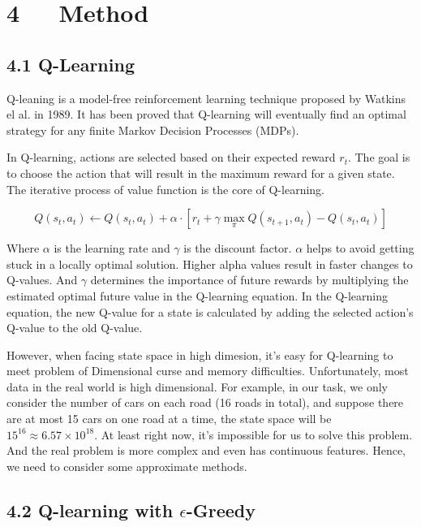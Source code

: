 \documentclass[letterpaper]{article} %
\begin{document}
\section{4\ \ \ Method}

\subsection{4.1 Q-Learning}
\hspace*{1em}Q-leaning is a model-free reinforcement learning technique proposed by Watkins el al. in 1989. It has been proved that Q-learning will eventually find an optimal strategy for any finite Markov Decision Processes (MDPs).
\vspace*{0.1cm}

In Q-learning, actions are selected based on their expected reward $r_t$. The goal is to choose the action that will result in the maximum reward for a given state. The iterative process of value function is the core of Q-learning.
\begin{small}
	$$Q(s_t,a_t)\leftarrow Q(s_t,a_t)+\alpha\cdot\left[r_t+\gamma\max_\pi Q(s_{t+1},a_t)-Q(s_t,a_t)\right]$$
\end{small}\noindent

Where $\alpha$ is the learning rate and $\gamma$ is the discount factor. $\alpha$ helps to avoid getting stuck in a locally optimal solution. Higher alpha values result in faster changes to Q-values. And $\gamma$ determines the importance of future rewards by multiplying the estimated optimal future value in the Q-learning equation. In the Q-learning equation, the new Q-value for a state is calculated by adding the selected action's Q-value to the old Q-value.

However, when facing state space in high dimesion, it's easy for Q-learning to meet problem of Dimensional curse and memory difficulties. Unfortunately, most data in the real world is high dimensional. For example, in our task, we only consider the number of cars on each road (16 roads in total), and suppose there are at most 15 cars on one road at a time, the state space will be $15^{16}\approx 6.57\times 10 ^{18}$. At least right now, it's impossible for us to solve this problem. And the real problem is more complex and even has continuous features. Hence, we need to consider some approximate methods.

\subsection{4.2 Q-learning with {\huge $\epsilon$}-Greedy}
\end{document}
